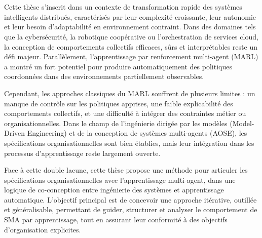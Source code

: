 \clearpage
\thispagestyle{empty}
\null
\newpage

\cleardoublepage
{}

\

\vspace{1em}

\bigskip

\\

\noindent
Cette thèse s’inscrit dans un contexte de transformation rapide des systèmes intelligents distribués, caractérisés par leur complexité croissante, leur autonomie et leur besoin d’adaptabilité en environnement contraint. Dans des domaines tels que la cybersécurité, la robotique coopérative ou l’orchestration de services cloud, la conception de comportements collectifs efficaces, sûrs et interprétables reste un défi majeur. Parallèlement, l’apprentissage par renforcement multi-agent (MARL) a montré un fort potentiel pour produire automatiquement des politiques coordonnées dans des environnements partiellement observables.

Cependant, les approches classiques du MARL souffrent de plusieurs limites : un manque de contrôle sur les politiques apprises, une faible explicabilité des comportements collectifs, et une difficulté à intégrer des contraintes métier ou organisationnelles. Dans le champ de l'ingénierie dirigée par les modèles (Model-Driven Engineering) et de la conception de systèmes multi-agents (AOSE), les spécifications organisationnelles sont bien établies, mais leur intégration dans les processus d’apprentissage reste largement ouverte.

Face à cette double lacune, cette thèse propose une méthode pour articuler les spécifications organisationnelles avec l’apprentissage multi-agent, dans une logique de co-conception entre ingénierie des systèmes et apprentissage automatique. L’objectif principal est de concevoir une approche itérative, outillée et généralisable, permettant de guider, structurer et analyser le comportement de SMA par apprentissage, tout en assurant leur conformité à des objectifs d’organisation explicites.

\

\vspace{1em}

